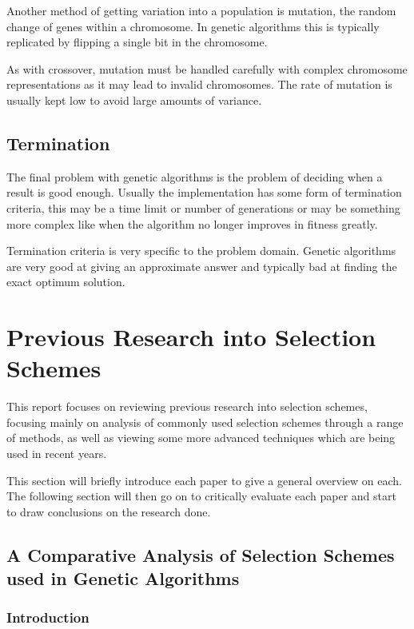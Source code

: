 \documentclass[10pt, a4paper]{article}
\begin{document}
Another method of getting variation into a population is mutation, the random
change of genes within a chromosome. In genetic algorithms this is typically
replicated by flipping a single bit in the chromosome.

As with crossover, mutation must be handled carefully with complex chromosome
representations as it may lead to invalid chromosomes. The rate of mutation 
is usually kept low to avoid large amounts of variance.


\subsection{Termination}

The final problem with genetic algorithms is the problem of deciding when a 
result is good enough. Usually the implementation has some form of termination
criteria, this may be a time limit or number of generations or may be something
more complex like when the algorithm no longer improves in fitness greatly.

Termination criteria is very specific to the problem domain. Genetic algorithms
are very good at giving an approximate answer and typically bad at finding the
exact optimum solution.

\FloatBarrier

\newpage
\section{Previous Research into Selection Schemes}
\label{sec:selection-algorithms}

This report focuses on reviewing previous research into selection schemes,
focusing mainly on analysis of commonly used selection schemes through a range
of methods, as well as viewing some more advanced techniques which are being
used in recent years.

This section will briefly introduce each paper to give a general overview on
each. The following section will then go on to critically evaluate each paper
and start to draw conclusions on the research done.

\subsection{A Comparative Analysis of Selection Schemes used in Genetic Algorithms}
\subsubsection{Introduction}
\end{document}

